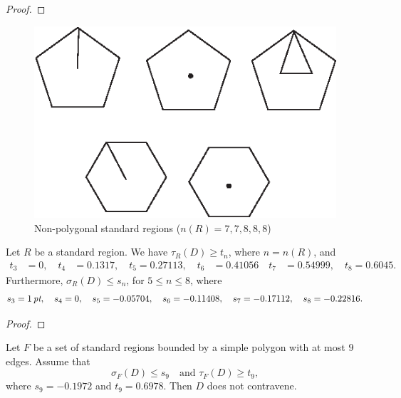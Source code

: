 \begin{proof} 
\end{proof}

\begin{figure}[htb]
  \centering
  \includegraphics{PS/nonpolygon.eps}
  \caption{Non-polygonal standard regions ($n(R)=7,7,8,8,8$)}
  \label{fig:aggregates}
\end{figure}

\begin{lemma} \label{lemma:sn-tn}
Let $R$ be a standard region.  We have
$\tau_R(D)\ge t_n$, where $n=n(R)$, and
    $$
    \begin{array}{lllll}
    t_3&=0,\quad t_4&=0.1317,\quad t_5=0.27113,\quad
    t_6&=0.41056\quad t_7&=0.54999,\quad t_8=0.6045.
    \end{array}
    $$
Furthermore, $\sigma_R(D)\le s_n$, for $5\le n\le 8$, where
    $$
    s_3=1\,\hbox{\it pt},\quad s_4=0,\quad
    s_5=-0.05704,\quad s_6=-0.11408,\quad
    s_7=-0.17112,\quad s_8=-0.22816.
    $$
\end{lemma}

\begin{proof} 
\end{proof}


\begin{lemma} \label{lemma:s9-t9:bis}
Let $F$ be a set of standard regions bounded by a simple polygon
with at most $9$ edges.  Assume  that
    $$\sigma_F(D) \le s_9\quad\text{and }\tau_F(D)\ge t_9,$$
where $s_9=-0.1972$ and $t_9=0.6978$.  Then $D$ does not
contravene.
\end{lemma}

